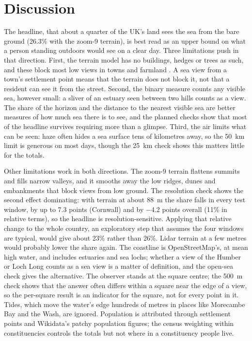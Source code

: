 \documentclass[11pt,a4paper]{article}
\begin{document}
\section{Discussion}\label{sec:disc}
The headline, that about a quarter of the UK's land sees the sea from the bare ground (26.3\% with the zoom-9 terrain), is best read as an upper bound on what a person standing outdoors would see on a clear day. Three limitations push in that direction. First, the terrain model has no buildings, hedges or trees as such, and these block most low views in towns and farmland \citep{sander2007}. A sea view from a town's settlement point means that the terrain does not block it, not that a resident can see it from the street. Second, the binary measure counts any visible sea, however small: a sliver of an estuary seen between two hills counts as a view. The share of the horizon and the distance to the nearest visible sea are better measures of how much sea there is to see, and the planned checks show that most of the headline survives requiring more than a glimpse. Third, the air limits what can be seen: haze often hides a sea surface tens of kilometres away, so the 50~km limit is generous on most days, though the 25~km check shows this matters little for the totals.

Other limitations work in both directions. The zoom-9 terrain flattens summits and fills narrow valleys, and it smooths away the low ridges, dunes and embankments that block views from low ground. The resolution check shows the second effect dominating: with terrain at about 88~m the share falls in every test window, by up to 7.3 points (Cornwall) and by $-$4.2 points overall (11\% in relative terms), so the headline is resolution-sensitive. Applying that relative change to the whole country, an exploratory step that assumes the four windows are typical, would give about 23\% rather than 26\%. Lidar terrain at a few metres would probably lower the share again. The coastline is OpenStreetMap's, at mean high water, and includes estuaries and sea lochs; whether a view of the Humber or Loch Long counts as a sea view is a matter of definition, and the open-sea check gives the alternative. The observer stands at the square centre; the 500~m check shows that the answer often differs within a square near the edge of a view, so the per-square result is an indicator for the square, not for every point in it. Tides, which move the water's edge hundreds of metres in places like Morecambe Bay and the Wash, are ignored. Population is attributed through settlement points and Wikidata's patchy population figures; the census weighting within constituencies controls the totals but not where in a constituency people live.
\end{document}
